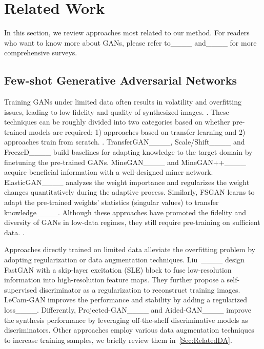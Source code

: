 \section{Related Work}
In this section, we review approaches most related to our method.
For readers who want to know more about GANs, please refer to____ and____ for more comprehensive surveys.

\subsection{Few-shot Generative Adversarial Networks}
Training GANs under limited data often results in volatility and overfitting issues, leading to low fidelity and quality of synthesized images.
%
.
%
These techniques can be roughly divided into two categories based on whether pre-trained models are required: 1) approaches based on transfer learning and 2) approaches train from scratch.
%
.
%
TransferGAN____, Scale/Shift____ and FreezeD____ build baselines for adapting knowledge to the target domain by finetuning the pre-trained GANs.
%
MineGAN____ and MineGAN++____ acquire beneficial information with a well-designed miner network.
%
ElasticGAN____ analyzes the weight importance and regularizes the weight changes quantitatively during the adaptive process.
%
Similarly, FSGAN learns to adapt the pre-trained weights' statistics (singular values) to transfer knowledge____.
Although these approaches have promoted the fidelity and diversity of GANs in low-data regimes, they still require pre-training on sufficient data.
.

Approaches directly trained on limited data alleviate the overfitting problem by adopting regularization or data augmentation techniques.
Liu~\etal____ design FastGAN with a skip-layer excitation (SLE) block to fuse low-resolution information into high-resolution feature maps. They further propose a self-supervised discriminator as a regularization to reconstruct training images.
LeCam-GAN improves the performance and stability by adding a regularized loss____.
Differently, Projected-GAN____ and Aided-GAN____ improve the synthesis performance by leveraging off-the-shelf discriminative models as discriminators.
%
Other approaches employ various data augmentation techniques to increase training samples, we briefly review them in~\ref{Sec:RelatedDA}.

